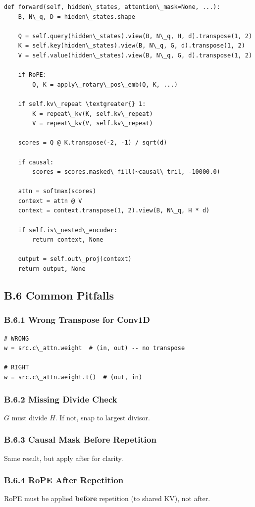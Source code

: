 \begin{lstlisting}
def forward(self, hidden\_states, attention\_mask=None, ...):
    B, N\_q, D = hidden\_states.shape
    
    Q = self.query(hidden\_states).view(B, N\_q, H, d).transpose(1, 2)
    K = self.key(hidden\_states).view(B, N\_q, G, d).transpose(1, 2)
    V = self.value(hidden\_states).view(B, N\_q, G, d).transpose(1, 2)
    
    if RoPE:
        Q, K = apply\_rotary\_pos\_emb(Q, K, ...)
    
    if self.kv\_repeat \textgreater{} 1:
        K = repeat\_kv(K, self.kv\_repeat)
        V = repeat\_kv(V, self.kv\_repeat)
    
    scores = Q @ K.transpose(-2, -1) / sqrt(d)
    
    if causal:
        scores = scores.masked\_fill(~causal\_tril, -10000.0)
    
    attn = softmax(scores)
    context = attn @ V
    context = context.transpose(1, 2).view(B, N\_q, H * d)
    
    if self.is\_nested\_encoder:
        return context, None
    
    output = self.out\_proj(context)
    return output, None
\end{lstlisting}

\subsection{B.6 Common Pitfalls}

\subsubsection{B.6.1 Wrong Transpose for Conv1D}

\begin{lstlisting}
# WRONG
w = src.c\_attn.weight  # (in, out) -- no transpose

# RIGHT
w = src.c\_attn.weight.t()  # (out, in)
\end{lstlisting}

\subsubsection{B.6.2 Missing Divide Check}

$G$ must divide $H$. If not, snap to largest divisor.

\subsubsection{B.6.3 Causal Mask Before Repetition}

Same result, but apply after for clarity.

\subsubsection{B.6.4 RoPE After Repetition}

RoPE must be applied \textbf{before} repetition (to shared KV), not after.